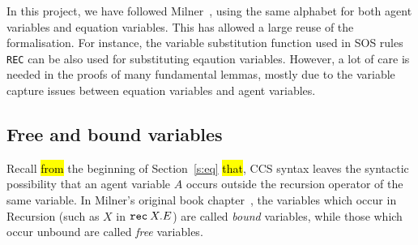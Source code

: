 In this project, we have followed Milner~\cite{Mil89}, using the
same alphabet for both agent variables and equation variables.
This has allowed a large reuse of the \univariate formalisation.
For instance, the variable
substitution function used in SOS rules \texttt{REC} can be also
used for substituting eqaution variables.
However, a lot of care is needed in the proofs of many
fundamental lemmas, mostly due to the variable capture issues between
equation variables and agent variables.


\subsection{Free and bound variables}

Recall \hl{from} the beginning of Section~\ref{s:eq} \hl{that},
CCS syntax leaves the syntactic possibility that an
agent variable $A$ occurs outside the recursion operator of the same
variable. In Milner's original book chapter~\cite{milner1990operational}, the
variables which occur in Recursion (such as $X$ in ${\tt rec}\: X . E$) are
called \emph{bound} variables, while those which occur unbound are called
\emph{free} variables. 

